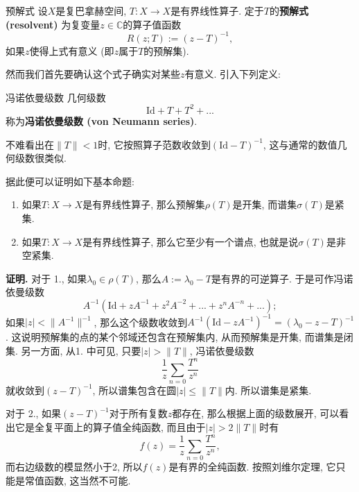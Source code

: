 

\begin{definition}{预解式}
设$X$是复巴拿赫空间, $T:X\to X$是有界线性算子. 定于$T$的\textbf{预解式 (resolvent)} 为复变量$z\in\mathbb{C}$的算子值函数
$$
R(z;T):=(z-T)^{-1},
$$
如果$z$使得上式有意义 (即$z$属于$T$的预解集).
\end{definition}

然而我们首先要确认这个式子确实对某些$z$有意义. 引入下列定义:

\begin{definition}{冯诺依曼级数}
几何级数
$$
\text{Id}+T+T^2+...
$$
称为\textbf{冯诺依曼级数 (von Neumann series)}.
\end{definition}
不难看出在$\|T\|<1$时, 它按照算子范数收敛到$(\text{Id}-T)^{-1}$, 这与通常的数值几何级数很类似.

据此便可以证明如下基本命题:

\begin{theorem}{}
\begin{enumerate}
\item 如果$T:X\to X$是有界线性算子, 那么预解集$\rho(T)$是开集, 而谱集$\sigma(T)$是紧集.
\item 如果$T:X\to X$是有界线性算子, 那么它至少有一个谱点, 也就是说$\sigma(T)$是非空紧集.
\end{enumerate}
\end{theorem}
\textbf{证明.} 
对于 1., 如果$\lambda_0\in\rho(T)$, 那么$A:=\lambda_0-T$是有界的可逆算子. 于是可作冯诺依曼级数
$$
A^{-1}(\text{Id}+zA^{-1}+z^2A^{-2}+...+z^nA^{-n}+...);
$$
如果$|z|<\|A^{-1}\|^{-1}$, 那么这个级数收敛到$A^{-1}(\text{Id}-zA^{-1})^{-1}=(\lambda_0-z-T)^{-1}$. 这说明预解集的点的某个邻域还包含在预解集内, 从而预解集是开集, 而谱集是闭集. 另一方面, 从1. 中可见, 只要$|z|>\|T\|$, 冯诺依曼级数
$$
\frac{1}{z}\sum_{n=0}\frac{T^n}{z^n}
$$
就收敛到$(z-T)^{-1}$, 所以谱集包含在圆$|z|\leq\|T\|$内. 所以谱集是紧集.

对于 2., 如果$(z-T)^{-1}$对于所有复数$z$都存在, 那么根据上面的级数展开, 可以看出它是全复平面上的算子值全纯函数, 而且由于$|z|>2\|T\|$时有
$$
f(z)=\frac{1}{z}\sum_{n=0}\frac{T^n}{z^n},
$$
而右边级数的模显然小于2, 所以$f(z)$是有界的全纯函数. 按照刘维尔定理, 它只能是常值函数, 这当然不可能.